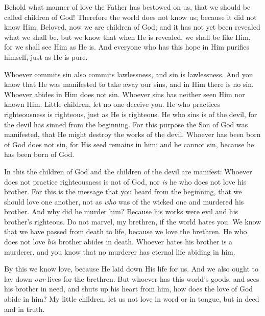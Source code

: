 
\bverse Behold what manner of love the Father has bestowed on us, that we should be called children of God! Therefore the world does not know us; because it did not know Him.
\bverse Beloved, now we are children of God; and it has not yet been revealed what we shall be, but we know that when He is revealed, we shall be like Him, for we shall see Him as He is.
\bverse And everyone who has this hope in Him purifies himself, just as He is pure.


\bverse Whoever commits sin also commits lawlessness, and sin is lawlessness.
\bverse And you know that He was manifested to take away our sins, and in Him there is no sin.
\bverse Whoever abides in Him does not sin. Whoever sins has neither seen Him nor known Him.
\bverse Little children, let no one deceive you. He who practices righteousness is righteous, just as He is righteous.
\bverse He who sins is of the devil, for the devil has sinned from the beginning. For this purpose the Son of God was manifested, that He might destroy the works of the devil.
\bverse Whoever has been born of God does not sin, for His seed remains in him; and he cannot sin, because he has been born of God.


\bverse In this the children of God and the children of the devil are manifest: Whoever does not practice righteousness is not of God, nor \textit{is} he who does not love his brother.
\bverse For this is the message that you heard from the beginning, that we should love one another,
\bverse not as  \textit{who} was of the wicked one and murdered his brother. And why did he murder him? Because his works were evil and his brother's righteous.
\bverse Do not marvel, my brethren, if the world hates you.
\bverse We know that we have passed from death to life, because we love the brethren. He who does not love \textit{his} brother abides in death.
\bverse Whoever hates his brother is a murderer, and you know that no murderer has eternal life abiding in him.


\bverse By this we know love, because He laid down His life for us. And we also ought to lay down \textit{our} lives for the brethren.
\bverse But whoever has this world's goods, and sees his brother in need, and shuts up his heart from him, how does the love of God abide in him?
\bverse My little children, let us not love in word or in tongue, but in deed and in truth.

